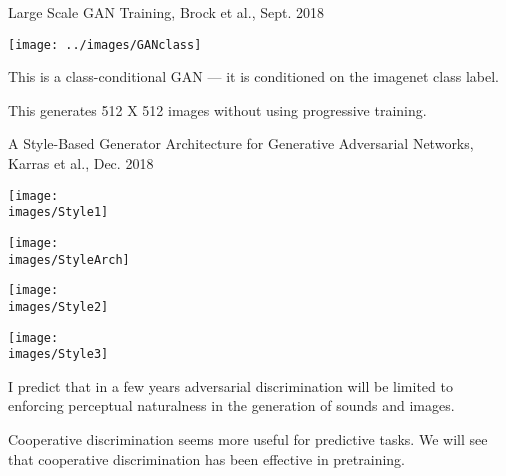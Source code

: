 {
\centerline{Large Scale GAN Training, Brock et al., Sept. 2018}
\centerline{\texttt{[image: ../images/GANclass]}}

\vfill
This is a class-conditional GAN --- it is conditioned on the imagenet class label.

\vfill
This generates 512 X 512 images without using progressive training.

{\Large A Style-Based Generator Architecture for Generative Adversarial Networks, Karras et al., Dec. 2018}

\centerline{\texttt{[image: \\images/Style1]}}


\centerline{\texttt{[image: \\images/StyleArch]}}


\centerline{\texttt{[image: \\images/Style2]}}


\centerline{\texttt{[image: \\images/Style3]}}



\vfill
I predict that in a few years adversarial discrimination will be limited to enforcing perceptual naturalness in the generation of sounds and images.

\vfill
Cooperative discrimination seems more useful for predictive tasks. We will see that cooperative discrimination has been effective in pretraining.

}

